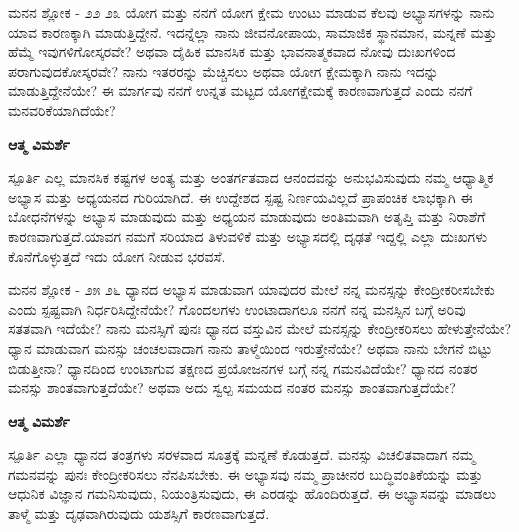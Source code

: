 \newpage
\begin{mananam}{\mananamfont \large{ಮನನ ಶ್ಲೋಕ - ೨೨ ೨೩}}
\mananamtext ಯೋಗ ಮತ್ತು ನನಗೆ ಯೋಗ ಕ್ಷೇಮ ಉಂಟು ಮಾಡುವ ಕೆಲವು ಅಭ್ಯಾಸಗಳನ್ನು ನಾನು ಯಾವ ಕಾರಣಕ್ಕಾಗಿ ಮಾಡುತ್ತಿದ್ದೇನೆ. ಇದನ್ನೆಲ್ಲಾ ನಾನು ಜೀವನೋಪಾಯ, ಸಾಮಾಜಿಕ ಸ್ಥಾನಮಾನ, ಮನ್ನಣೆ ಮತ್ತು ಹೆಮ್ಮೆ ಇವುಗಳಿಗೋಸ್ಕರವೇ? ಅಥವಾ ದೈಹಿಕ ಮಾನಸಿಕ ಮತ್ತು ಭಾವನಾತ್ಮಕವಾದ ನೋವು ದುಃಖಗಳಿಂದ ಪರಾಗುವುದಕೋಸ್ಕರವೇ? ನಾನು ಇತರರನ್ನು ಮೆಚ್ಚಿಸಲು ಅಥವಾ ಯೋಗ ಕ್ಷೇಮಕ್ಕಾಗಿ ನಾನು ಇದನ್ನು ಮಾಡುತ್ತಿದ್ದೇನೆಯೇ? ಈ ಮಾರ್ಗವು ನನಗೆ ಉನ್ನತ ಮಟ್ಟದ ಯೋಗಕ್ಷೇಮಕ್ಕೆ ಕಾರಣವಾಗುತ್ತದೆ ಎಂದು ನನಗೆ ಮನವರಿಕೆಯಾಗಿದೆಯೇ?
\end{mananam}
\WritingHand\enspace\textbf{ಆತ್ಮ ವಿಮರ್ಶೆ}\\
\begin{inspiration}{\mananamfont \large ಸ್ಪೂರ್ತಿ}
\mananamtext ಎಲ್ಲ ಮಾನಸಿಕ ಕಷ್ಟಗಳ ಅಂತ್ಯ ಮತ್ತು ಅಂತರ್ಗತವಾದ ಆನಂದವನ್ನು ಅನುಭವಿಸುವುದು ನಮ್ಮ ಆಧ್ಯಾತ್ಮಿಕ ಅಭ್ಯಾಸ ಮತ್ತು ಅಧ್ಯಯನದ ಗುರಿಯಾಗಿದೆ. ಈ ಉದ್ದೇಶದ ಸ್ಪಷ್ಟ ನಿರ್ಣಯವಿಲ್ಲದೆ ಪ್ರಾಪಂಚಿಕ ಲಾಭಕ್ಕಾಗಿ ಈ ಬೋಧನೆಗಳನ್ನು ಅಭ್ಯಾಸ ಮಾಡುವುದು ಮತ್ತು ಅಧ್ಯಯನ ಮಾಡುವುದು ಅಂತಿಮವಾಗಿ ಅತೃಪ್ತಿ ಮತ್ತು ನಿರಾಶೆಗೆ ಕಾರಣವಾಗುತ್ತದೆ.ಯಾವಗ ನಮಗೆ ಸರಿಯಾದ ತಿಳುವಳಿಕೆ ಮತ್ತು ಅಭ್ಯಾಸದಲ್ಲಿ ದೃಢತೆ ಇದ್ದಲ್ಲಿ ಎಲ್ಲಾ ದುಃಖಗಳು ಕೊನೆಗೊಳ್ಳುತ್ತದೆ ಇದು ಯೋಗ ನೀಡುವ ಭರವಸೆ.
\end{inspiration}
\newpage

\newpage
\begin{mananam}{\mananamfont \large{ಮನನ ಶ್ಲೋಕ - ೨೫ ೨೬}}
\mananamtext ಧ್ಯಾನದ  ಅಭ್ಯಾಸ ಮಾಡುವಾಗ ಯಾವುದರ ಮೇಲೆ ನನ್ನ ಮನಸ್ಸನ್ನು ಕೇಂದ್ರೀಕರೀಸಬೇಕು ಎಂದು ಸ್ಪಷ್ಟವಾಗಿ ನಿರ್ಧರಿಸಿದ್ದೇನೆಯೇ? ಗೊಂದಲಗಳು ಉಂಟಾದಾಗಲೂ ನನಗೆ ನನ್ನ ಮನಸ್ಸಿನ ಬಗ್ಗೆ ಅರಿವು ಸತತವಾಗಿ ಇದೆಯೇ? ನಾನು ಮನಸ್ಸಿಗೆ ಪುನಃ ಧ್ಯಾನದ ವಸ್ತುವಿನ ಮೇಲೆ ಮನಸ್ಸನ್ನು ಕೇಂದ್ರೀಕರಿಸಲು ಹೇಳುತ್ತೇನೆಯೇ?\\
ಧ್ಯಾನ ಮಾಡುವಾಗ ಮನಸ್ಸು ಚಂಚಲವಾದಾಗ ನಾನು ತಾಳ್ಮೆಯಿಂದ ಇರುತ್ತೇನೆಯೇ? ಅಥವಾ ನಾನು ಬೇಗನೆ ಬಿಟ್ಟು ಬಿಡುತ್ತೀನಾ? ಧ್ಯಾನದಿಂದ ಉಂಟಾಗುವ ತಕ್ಷಣದ ಪ್ರಯೋಜನಗಳ ಬಗ್ಗೆ ನನ್ನ ಗಮನವಿದೆಯೇ? ಧ್ಯಾನದ  ನಂತರ ಮನಸ್ಸು ಶಾಂತವಾಗುತ್ತದೆಯೇ? ಅಥವಾ ಅದು ಸ್ವಲ್ಪ ಸಮಯದ ನಂತರ ಮನಸ್ಸು ಶಾಂತವಾಗುತ್ತದೆಯೇ?
\end{mananam}
\WritingHand\enspace\textbf{ಆತ್ಮ ವಿಮರ್ಶೆ}\\
\begin{inspiration}{\mananamfont \large ಸ್ಪೂರ್ತಿ}
\mananamtext ಎಲ್ಲಾ ಧ್ಯಾನದ  ತಂತ್ರಗಳು ಸರಳವಾದ ಸೂತ್ರಕ್ಕೆ ಮನ್ನಣೆ ಕೊಡುತ್ತದೆ. ಮನಸ್ಸು ವಿಚಲಿತವಾದಾಗ ನಮ್ಮ ಗಮನವನ್ನು ಪುನಃ ಕೇಂದ್ರೀಕರಿಸಲು ನೆನಪಿಸಬೇಕು. ಈ ಅಭ್ಯಾಸವು ನಮ್ಮ ಪ್ರಾಚೀನರ ಬುದ್ಧಿವಂತಿಕೆಯನ್ನು ಮತ್ತು ಆಧುನಿಕ ವಿಜ್ಞಾನ ಗಮನಿಸುವುದು, ನಿಯಂತ್ರಿಸುವುದು, ಈ ಎರಡನ್ನು  ಹೊಂದಿರುತ್ತದೆ. ಈ ಅಭ್ಯಾಸವನ್ನು ಮಾಡಲು ತಾಳ್ಮೆ ಮತ್ತು ದೃಢವಾಗಿರುವುದು ಯಶಸ್ಸಿಗೆ  ಕಾರಣವಾಗುತ್ತದೆ.
\end{inspiration}
\newpage

